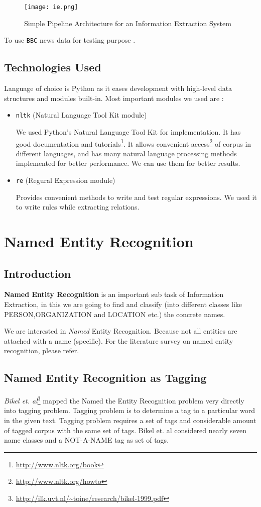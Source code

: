 \documentclass[12pt]{report}
\begin{document}
\begin{figure}[h]
\centering
\texttt{[image: ie.png]}
\caption{Simple Pipeline Architecture for an Information Extraction System\cite{BookIE}}
\label{IE}
\end{figure}
To use \texttt{BBC} news data for testing purpose .
\section{Technologies Used}
Language of choice is Python as it eases development with high-level data structures and modules built-in. Most important modules we used are :
\begin{itemize}
\item \texttt{nltk} (Natural Language Tool Kit module)
\par We used Python's  Natural Language Tool Kit for implementation. It has good documentation and tutorials\footnote{\url{http://www.nltk.org/book}}.
It allows convenient access\footnote{\url{http://www.nltk.org/howto}} of corpus in different languages, and has many natural language processing
 methods implemented for better performance. We can use them for better results.
\item \texttt{re} (Regural Expression module)
\par Provides convenient methods to write and test regular expressions. We used it to write rules while extracting relations.
\end{itemize}
\chapter{Named Entity Recognition}
\section{Introduction}
\par \textbf{Named Entity Recognition} is an important sub task of Information Extraction, 
in this we are going to find and classify (into different classes like PERSON,ORGANIZATION and LOCATION etc.) 
 the concrete names.
\par We are interested in \textit{Named} Entity Recognition. Because not all entities are 
attached with a name (specific).
For the literature survey on named entity recognition, please refer\cite{Rahul}.
\section{Named Entity Recognition as Tagging}
\par \textit{Bikel et. al}\footnote{\url{http://ilk.uvt.nl/~toine/research/bikel-1999.pdf}} mapped the  Named the Entity Recognition problem very directly into tagging problem. 
Tagging problem is to determine a tag to a particular word in the given text. Tagging problem requires
 a set of tags and considerable amount of tagged corpus with the same set of tags. Bikel et. al considered nearly seven name classes and a  
 NOT-A-NAME tag as set of tags.
 
\end{document}
